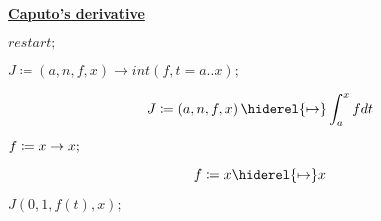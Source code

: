 \documentclass{article}
\begin{document}
	\lstset{basicstyle=\ttfamily,breaklines=true,columns=flexible}
	\pagestyle{empty}
	\begin{center}
		\begin{Maple Normal}
			\underline{\textbf{Caputo's derivative}}
		\end{Maple Normal}
	\end{center}
	\begin{Maple Normal}
		{$ \displaystyle \mathit{restart} ; $}
	\end{Maple Normal}
	\begin{Maple Normal}
		
	\end{Maple Normal}
	\begin{Maple Normal}
		{$ \displaystyle J \coloneqq (a ,n ,f ,x)\rightarrow \mathit{int} (f ,t =a ..x); $}
	\end{Maple Normal}
	\begin{dmath}\label{(1)}
		J \coloneqq \left(a ,n ,f ,x \right)\hiderel{\mapsto }\int_{a}^{x}f d t 
	\end{dmath}
	\begin{Maple Normal}
		
	\end{Maple Normal}
	\begin{Maple Normal}
		
	\end{Maple Normal}
	\begin{Maple Normal}
		{$ \displaystyle f \coloneqq x \rightarrow x ;
			\\
			$}
	\end{Maple Normal}
	\begin{dmath}\label{(2)}
		f \coloneqq x \hiderel{\mapsto }x 
	\end{dmath}
	\begin{Maple Normal}
		{$ \displaystyle J (0,1,f (t),x); $}
	\end{Maple Normal}
\end{document}
